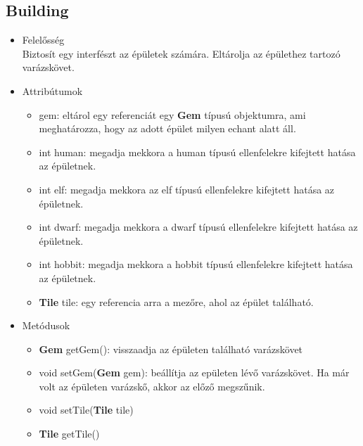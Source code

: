 \subsection{Building}
\begin{itemize}
\item Felelősség\\
Biztosít egy interfészt az épületek számára. Eltárolja az épülethez tartozó varázskövet.
\item Attribútumok
	\begin{itemize}
		\item gem: eltárol egy referenciát egy \textbf{Gem} típusú objektumra, ami meghatározza, hogy az adott épület milyen echant alatt áll.
		\item int human: megadja mekkora a human típusú ellenfelekre kifejtett hatása az épületnek.
		\item int elf: megadja mekkora az elf típusú ellenfelekre kifejtett hatása az épületnek.
		\item int dwarf: megadja mekkora a dwarf típusú ellenfelekre kifejtett hatása az épületnek.
		\item int hobbit: megadja mekkora a hobbit típusú ellenfelekre kifejtett hatása az épületnek.
		\item \textbf{Tile} tile: egy referencia arra a mezőre, ahol az épület található.
	\end{itemize}
\item Metódusok\\
	\begin{itemize}
		\item \textbf{Gem} getGem(): visszaadja az épületen található varázskövet
		\item void setGem(\textbf{Gem} gem): beállítja az epületen lévő varázskövet. Ha már volt az épületen varázskő, akkor az előző megszűnik.
		\item void setTile(\textbf{Tile} tile)
		\item \textbf{Tile} getTile()
	\end{itemize}
\end{itemize}

